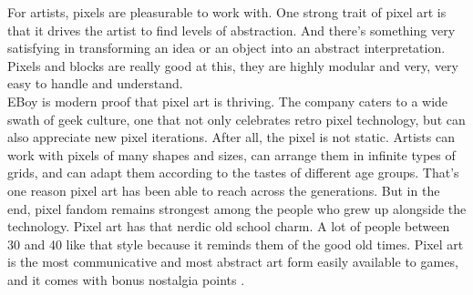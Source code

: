 \documentclass[]{usiinfbachelorproject}
\begin{document}
For artists, pixels are pleasurable to work with. One strong trait of pixel art is that it drives the artist to find levels of abstraction. And there's something very satisfying in transforming an idea or an object into an abstract interpretation. Pixels and blocks are really good at this, they are highly modular and very, very easy to handle and understand.\\
EBoy is modern proof that pixel art is thriving. The company caters to a wide swath of geek culture, one that not only celebrates retro pixel technology, but can also appreciate new pixel iterations. After all, the pixel is not static. Artists can work with pixels of many shapes and sizes, can arrange them in infinite types of grids, and can adapt them according to the tastes of different age groups. That's one reason pixel art has been able to reach across the generations. But in the end, pixel fandom remains strongest among the people who grew up alongside the technology. Pixel art has that nerdic old school charm. A lot of people between 30 and 40 like that style because it reminds them of the good old times. Pixel art is the most communicative and most abstract art form easily available to games, and it comes with bonus nostalgia points \cite{website:arstechnica}.\\
\end{document}
